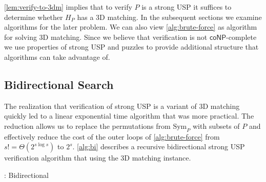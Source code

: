 \documentclass[11pt]{article}
\newcommand\Sym[1]{\ensuremath{\mathrm{Sym}_{#1}}}
\newcommand\coNP{\ensuremath{\mathsf{coNP}}}
\begin{document}
\autoref{lem:verify-to-3dm} implies that to verify $P$ is a strong USP
it suffices to determine whether $H_P$ has a 3D matching.  In the
subsequent sections we examine algorithms for the later problem.  We
can also view \autoref{alg:brute-force} as algorithm for solving 3D
matching.  Since we believe that verification is not \coNP-complete we
use properties of strong USP and puzzles to provide additional
structure that algorithms can take advantage of.


\subsection{Bidirectional Search}

The realization that verification of strong USP is a variant of 3D
matching quickly led to a linear exponential time algorithm that was
more practical.  The reduction allows us to replace the permutations
from $\Sym{P}$ with subsets of $P$ and effectively reduce the cost of
the outer loops of \autoref{alg:brute-force} from $s! =
\Theta(2^{s\log s})$ to $2^s$.  \autoref{alg:bi} describes a recursive
bidirectional strong USP verification algorithm that using the 3D
matching instance.

\begin{algorithm}
  \caption{: Bidirectional}
  \label{alg:bi}
\begin{algorithmic}[1]
     
    \Else {}
        \Else {} \EndIf
    \EndIf
  \EndIf
   
      \EndIf
    \EndFor
  \EndFor
  \EndFunction

  \EndFunction
\end{algorithmic}
\end{algorithm}
\end{document}
